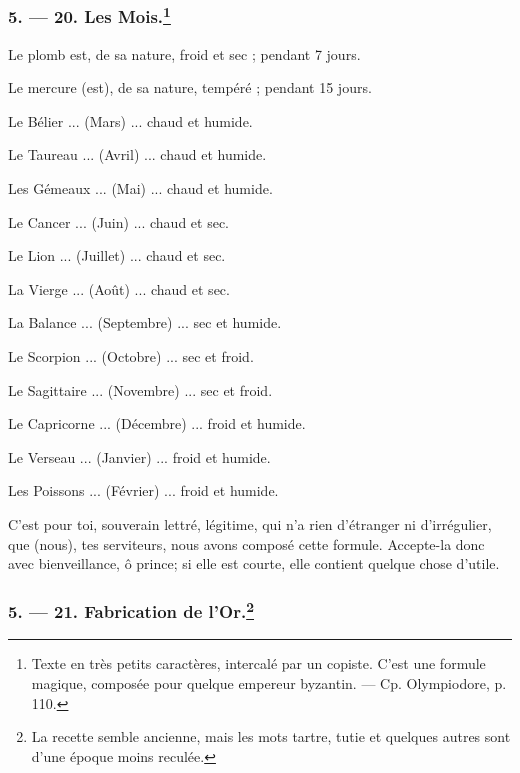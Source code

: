 \documentclass[a4paper, 11pt, oneside, polutonikogreek, french]{article}
\begin{document}
\bigskip
\centerline{\EightStarTaper}
\centerline{\EightStarTaper\EightStarTaper}
\bigskip

\subsubsection[5. --- 20. Les Mois.]{5. --- 20. Les Mois.\footnote{Texte en très petits caractères, intercalé par un copiste. C'est une formule magique, composée pour quelque empereur byzantin. --- Cp. Olympiodore, p. 110.}}

Le plomb est, de sa nature, froid et sec ; pendant 7 jours.

Le mercure (est), de sa nature, tempéré ; pendant 15 jours.

Le Bélier ... (Mars) ... chaud et humide.

Le Taureau ... (Avril) ... chaud et humide.

Les Gémeaux ... (Mai) ... chaud et humide.

Le Cancer ... (Juin) ... chaud et sec.

Le Lion ... (Juillet) ... chaud et sec.

La Vierge ... (Août) ... chaud et sec.

La Balance ... (Septembre) ... sec et humide.

Le Scorpion ... (Octobre) ... sec et froid.

Le Sagittaire ... (Novembre) ... sec et froid.

Le Capricorne ... (Décembre) ... froid et humide.

Le Verseau ... (Janvier) ... froid et humide.

Les Poissons ... (Février) ... froid et humide.

C'est pour toi, souverain lettré, légitime, qui n'a rien d'étranger ni d'irrégulier, que (nous), tes serviteurs, nous avons composé cette formule. Accepte-la donc avec bienveillance, ô prince; si elle est courte, elle contient quelque chose d'utile.

\bigskip
\centerline{\EightStarTaper}
\centerline{\EightStarTaper\EightStarTaper}
\bigskip

\subsubsection[5. --- 21. Fabrication de l'Or.]{5. --- 21. Fabrication de l'Or.\footnote{La recette semble ancienne, mais les mots tartre, tutie et quelques autres sont d'une époque moins reculée.}}
\end{document}

